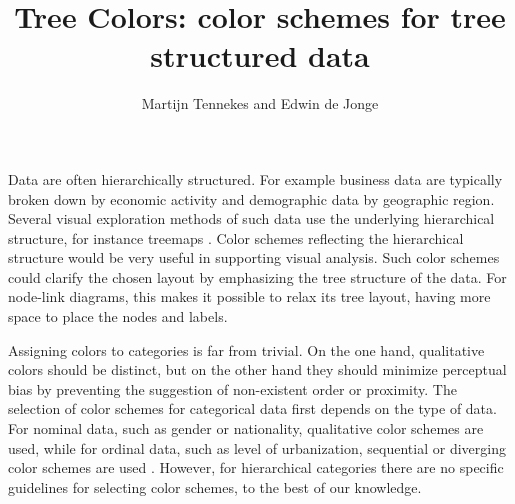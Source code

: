 \documentclass[journal]{vgtc}                %
\title{Tree Colors: color schemes for tree structured data}
\author{Martijn Tennekes and Edwin de Jonge}
\newcommand{\E}{\textcolor{cornellred}{\textbf{TO DO Edwin}}}
\newcommand{\changedE}[1]{\textcolor{cornellred}{#1}}
\newcommand{\changedM}[1]{\textcolor{blue}{#1}}
\begin{document}
\lstset{language=R}

\label{secintro}

\maketitle
Data are often hierarchically structured. For example business data are typically broken down by economic activity and demographic data by geographic region. Several visual exploration methods of such data use the underlying hierarchical structure, for instance treemaps
\cite{shneiderman1992,tennekes2011b}. Color schemes reflecting the hierarchical structure would be very useful in supporting visual analysis. 
Such color schemes could clarify the chosen layout by emphasizing the tree structure of the data. For node-link diagrams, this makes it possible to relax its tree layout, having more space to place the nodes and labels.

Assigning colors to categories is far from trivial. On the one hand, qualitative colors should be distinct, but on the other hand they should minimize perceptual bias by preventing the suggestion of non-existent order or proximity. The selection of color schemes for categorical data first depends on the type of data. For nominal data, such as gender or nationality, qualitative color schemes are used, while for ordinal data, such as level of urbanization, sequential or diverging color schemes are used \cite{brewer03, zeileis2009}. However, for hierarchical categories there are no specific guidelines for selecting color schemes, to the best of our knowledge.


\end{document}
